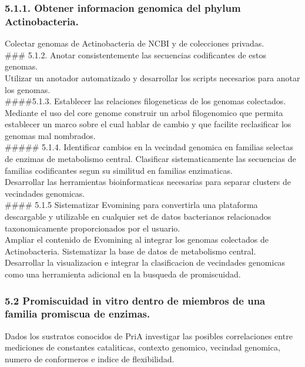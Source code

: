 \documentclass[12pt,twoside]{reedthesis}
\begin{document}
  \subsubsection{5.1.1. Obtener informacion genomica del phylum
  Actinobacteria.}\label{obtener-informacion-genomica-del-phylum-actinobacteria.}
  
  Colectar genomas de Actinobacteria de NCBI y de colecciones privadas.\\
  \#\#\# 5.1.2. Anotar consistentemente las secuencias codificantes de
  estos genomas.\\
  Utilizar un anotador automatizado y desarrollar los scripts necesarios
  para anotar los genomas.\\
  \#\#\#\#5.1.3. Establecer las relaciones filogeneticas de los genomas
  colectados.\\
  Mediante el uso del core genome construir un arbol filogenomico que
  permita establecer un marco sobre el cual hablar de cambio y que
  facilite reclasificar los genomas mal nombrados.\\
  \#\#\#\#\# 5.1.4. Identificar cambios en la vecindad genomica en
  familias selectas de enzimas de metabolismo central. Clasificar
  sistematicamente las secuencias de familias codificantes segun su
  similitud en familias enzimaticas.\\
  Desarrollar las herramientas bioinformaticas necesarias para separar
  clusters de vecindades genomicas.\\
  \#\#\#\# 5.1.5 Sistematizar Evomining para convertirla una plataforma
  descargable y utilizable en cualquier set de datos bacterianos
  relacionados taxonomicamente proporcionados por el usuario.\\
  Ampliar el contenido de Evomining al integrar los genomas colectados de
  Actinobacteria. Sistematizar la base de datos de metabolismo central.\\
  Desarrollar la visualizacion e integrar la clasificacion de vecindades
  genomicas como una herramienta adicional en la busqueda de promiscuidad.
  
  \subsubsection{5.2 Promiscuidad in vitro dentro de miembros de una
  familia promiscua de
  enzimas.}\label{promiscuidad-in-vitro-dentro-de-miembros-de-una-familia-promiscua-de-enzimas.}
  
  Dados los sustratos conocidos de PriA investigar las posibles
  correlaciones entre mediciones de constantes cataliticas, contexto
  genomico, vecindad genomica, numero de conformeros e indice de
  flexibilidad.
  
\end{document}
